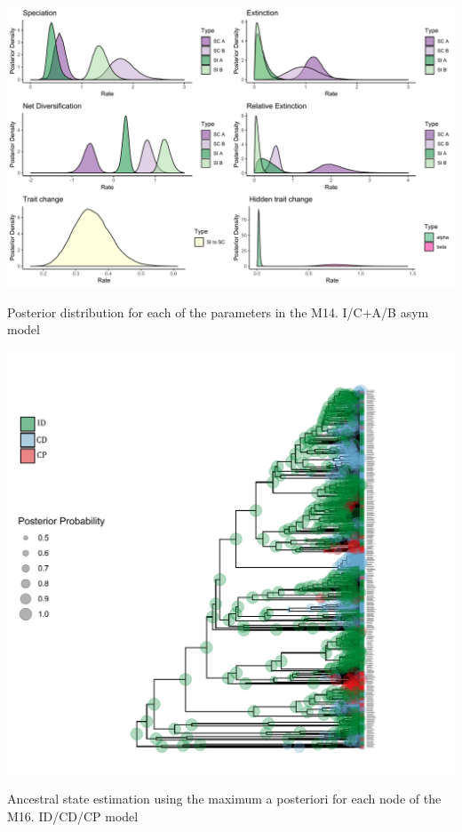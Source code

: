 \begin{suppfigure}
\includegraphics[width=\textwidth]{hisseSIasymposteriordist.pdf}
\caption{Posterior distribution for each of the parameters in the M14. I/C+A/B asym model} %
\label{suppfigure:ICAB}
\end{suppfigure}

\begin{suppfigure}
\includegraphics[width=\textwidth]{asrIDCDCP.pdf}
\caption{Ancestral state estimation using the maximum a posteriori for each node of the  M16. ID/CD/CP model} %
\label{suppfigure:IDCDCPnodipasr}
\end{suppfigure}



